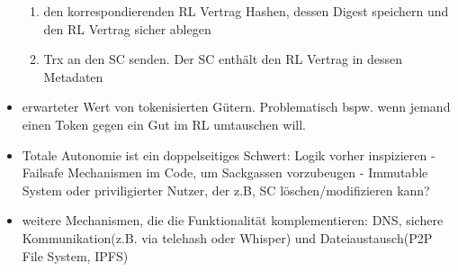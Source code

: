 \begin{itemize}
\begin{enumerate}
                    \item den korrespondierenden RL Vertrag Hashen, dessen Digest speichern und den RL Vertrag sicher ablegen
                    \item Trx an den SC senden. Der SC enthält den RL Vertrag in dessen Metadaten
                \end{enumerate}
            \item erwarteter Wert von tokenisierten Gütern. Problematisch bspw. wenn jemand einen Token gegen ein Gut im RL umtauschen will.
            \item Totale Autonomie ist ein doppelseitiges Schwert: Logik vorher inspizieren - Failsafe Mechanismen im Code, um Sackgassen vorzubeugen - Immutable System oder priviligierter Nutzer, der z.B, SC löschen/modifizieren kann?
            \item weitere Mechanismen, die die Funktionalität komplementieren: DNS, sichere Kommunikation(z.B. via telehash oder Whisper) und Dateiaustausch(P2P File System, IPFS)
        \end{itemize}